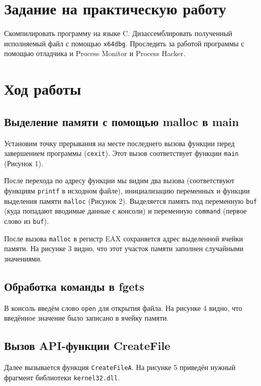 \section{Задание на практическую работу}
Скомпилировать программу на языке C. Дизассемблировать полученный исполняемый файл с помощью \texttt{x64dbg}. Проследить за работой программы с помощью отладчика и Process Monitor и Process Hacker.



\section{Ход работы}

\subsection{Выделение памяти с помощью malloc в main}

Установим точку прерывания на месте последнего вызова функции перед завершением программы (\texttt{cexit}). Этот вызов соответствует функции \texttt{main} (Рисунок 1). 

После перехода по адресу функции мы видим два вызова (соответствуют функциям \texttt{printf} в исходном файле), инициализацию переменных и функции выделения памяти \texttt{malloc} (Рисунок 2). Выделяется память под переменную \texttt{buf} (куда попадают вводимые данные с консоли) и переменную \texttt{command} (первое слово из \texttt{buf}).

После вызова \texttt{malloc} в регистр EAX сохраняется адрес выделенной ячейки памяти. На рисунке 3 видно, что этот участок памяти заполнен случайными значениями.
\FloatBarrier


\subsection{Обработка команды в fgets}
В консоль введём слово \texttt{open} для открытия файла. На рисунке 4 видно, что введённое значение было записано в ячейку памяти.

\FloatBarrier


\subsection{Вызов API-функции CreateFile}
Далее вызывается функция \texttt{CreateFileA}. На рисунке 5 приведён нужный фрагмент библиотеки \texttt{kernel32.dll}.

